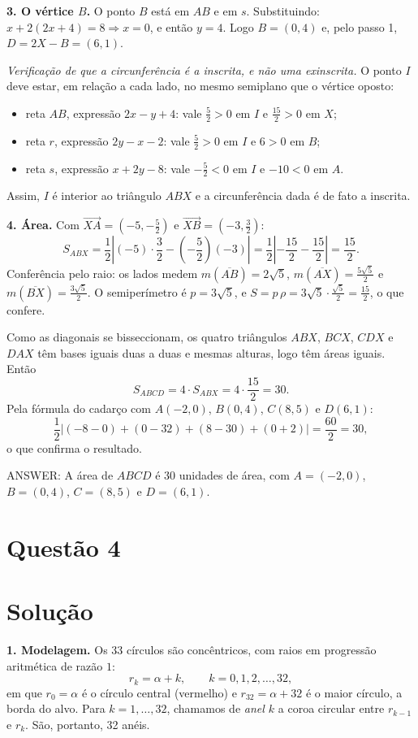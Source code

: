 \documentclass{article}%
\begin{document}
\textbf{3. O vértice $B$.}
O ponto $B$ está em $AB$ e em $s$. Substituindo: $x+2(2x+4)=8\Rightarrow x=0$, e então $y=4$. Logo $B=(0,4)$ e, pelo passo 1, $D=2X-B=(6,1)$.

\emph{Verificação de que a circunferência é a inscrita, e não uma exinscrita.} O ponto $I$ deve estar, em relação a cada lado, no mesmo semiplano que o vértice oposto:
\begin{itemize}
\item reta $AB$, expressão $2x-y+4$: vale $\frac52>0$ em $I$ e $\frac{15}{2}>0$ em $X$;
\item reta $r$, expressão $2y-x-2$: vale $\frac52>0$ em $I$ e $6>0$ em $B$;
\item reta $s$, expressão $x+2y-8$: vale $-\frac52<0$ em $I$ e $-10<0$ em $A$.
\end{itemize}
Assim, $I$ é interior ao triângulo $ABX$ e a circunferência dada é de fato a inscrita.

\textbf{4. Área.}
Com $\vec{XA}=\left(-5,-\frac52\right)$ e $\vec{XB}=\left(-3,\frac32\right)$:
\[
S_{ABX}=\frac12\left|(-5)\cdot\frac32-\left(-\frac52\right)(-3)\right|=\frac12\left|-\frac{15}{2}-\frac{15}{2}\right|=\frac{15}{2}.
\]
Conferência pelo raio: os lados medem $m(\overline{AB})=2\sqrt5$, $m(\overline{AX})=\frac{5\sqrt5}{2}$ e $m(\overline{BX})=\frac{3\sqrt5}{2}$. O semiperímetro é $p=3\sqrt5$, e $S=p\,\rho=3\sqrt5\cdot\frac{\sqrt5}{2}=\frac{15}{2}$, o que confere.

Como as diagonais se bisseccionam, os quatro triângulos $ABX$, $BCX$, $CDX$ e $DAX$ têm bases iguais duas a duas e mesmas alturas, logo têm áreas iguais. Então
\[
S_{ABCD}=4\cdot S_{ABX}=4\cdot\frac{15}{2}=30.
\]
Pela fórmula do cadarço com $A(-2,0)$, $B(0,4)$, $C(8,5)$ e $D(6,1)$:
\[
\frac12\left|(-8-0)+(0-32)+(8-30)+(0+2)\right|=\frac{60}{2}=30,
\]
o que confirma o resultado.

ANSWER: A área de $ABCD$ é $30$ unidades de área, com $A=(-2,0)$, $B=(0,4)$, $C=(8,5)$ e $D=(6,1)$.%
\newpage%
\section*{Questão 4}

\section*{Solução}

\textbf{1. Modelagem.} Os 33 círculos são concêntricos, com raios em progressão aritmética de razão $1$:
\[
r_k=\alpha+k,\qquad k=0,1,2,\dots,32 ,
\]
em que $r_0=\alpha$ é o círculo central (vermelho) e $r_{32}=\alpha+32$ é o maior círculo, a borda do alvo. Para $k=1,\dots,32$, chamamos de \emph{anel $k$} a coroa circular entre $r_{k-1}$ e $r_k$. São, portanto, 32 anéis.
\end{document}
